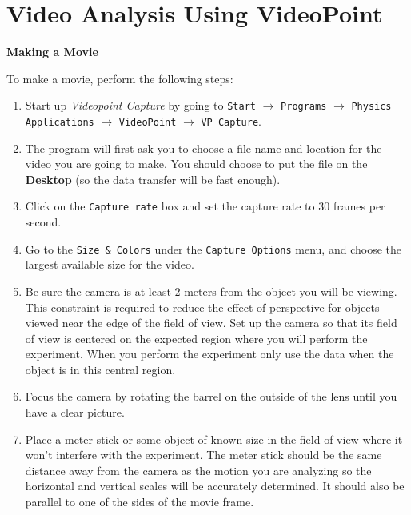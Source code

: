 
\section{Video Analysis Using VideoPoint}
\label{videopoint}
\textbf{Making a Movie} 

To make a movie, perform the following steps:

\begin{enumerate}
\item Start up {\it Videopoint Capture} by
going to {\tt Start} $\rightarrow$ {\tt Programs} $\rightarrow$
{\tt Physics Applications} $\rightarrow$ {\tt VideoPoint}
$\rightarrow$ {\tt VP Capture}.
\item The program will first ask you to choose a file name and location for 
the video you are going to make.  You should choose to put the file on the 
\textbf{Desktop} (so the data transfer will be fast enough).

\item Click on the {\tt Capture rate}
box and set the capture rate to 30 frames per second.
\item Go to the {\tt Size \& Colors} under the {\tt Capture Options} 
menu, and choose the largest available size for the video.


\item Be sure the camera is at least 2 meters from the object
you will be viewing. This constraint is required to reduce the effect
of perspective for objects viewed near the edge of the field of view.
Set up the camera so that its field of view is centered on the expected
region where you will perform the experiment. 
When you perform the experiment only use the data when the object is in this central region.

\item Focus the camera by rotating the barrel on the outside
of the lens until you have a clear picture.

\item Place a meter stick or some
object of known size in the field of view where it won't interfere
with the experiment. The meter stick should be the same distance away from
the camera as the motion you are analyzing so the horizontal and vertical 
scales will be accurately determined. It should also be parallel to one of the
sides of the movie frame.


\end{enumerate}
